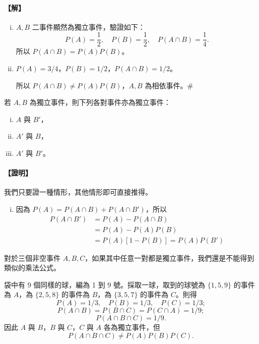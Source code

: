 \paragraph{【解】}
\begin{enumerate}[(i), leftmargin=2.5em, itemsep=0.3em]
  \item $A, B$ 二事件顯然為獨立事件，驗證如下：
  \[
  P(A) = \frac{1}{2}, \quad P(B) = \frac{1}{2}, \quad P(A \cap B) = \frac{1}{4}.
  \]
  所以 $P(A \cap B) = P(A)P(B)$。
  \item $P(A) = 3/4$，$P(B) = 1/2$，$P(A \cap B) = 1/2$。
  
  所以 $P(A \cap B) \neq P(A)P(B)$，$A, B$ 為相依事件。\hfill\#
\end{enumerate}

\medskip
\begin{theorem}\label{thm:b5s-4-7}
若 $A, B$ 為獨立事件，則下列各對事件亦為獨立事件：
\begin{enumerate}[(i), leftmargin=2.5em, itemsep=0.2em]
  \item $A$ 與 $B'$，
  \item $A'$ 與 $B$，
  \item $A'$ 與 $B'$。
\end{enumerate}
\end{theorem}
\paragraph{【證明】}
我們只要證一種情形，其他情形即可直接推得。
\begin{enumerate}[(i), leftmargin=2.5em, itemsep=0.3em]
  \item 因為 $P(A) = P(A \cap B) + P(A \cap B')$，所以
  \begin{align*}
  P(A \cap B') &= P(A) - P(A \cap B) \\
  &= P(A) - P(A)P(B) \\
  &= P(A)[1 - P(B)] = P(A)P(B') \tag*{\#}
  \end{align*}
\end{enumerate}

對於三個非空事件 $A, B, C$，如果其中任意一對都是獨立事件，我們還是不能得到類似的乘法公式。

\medskip
\begin{discussion}\label{disc:b5s-4-6}
袋中有 9 個同樣的球，編為 1 到 9 號。採取一球，取到的球號為 $\{1, 5, 9\}$ 的事件為 $A$，為 $\{2, 5, 8\}$ 的事件為 $B$，為 $\{3, 5, 7\}$ 的事件為 $C$。則得
\[
P(A) = 1/3, \quad P(B) = 1/3, \quad P(C) = 1/3;
\]
\[
P(A \cap B) = P(B \cap C) = P(C \cap A) = 1/9;
\]
\[
P(A \cap B \cap C) = 1/9.
\]
因此 $A$ 與 $B$，$B$ 與 $C$，$C$ 與 $A$ 各為獨立事件，但
\[
P(A \cap B \cap C) \neq P(A)P(B)P(C).
\]
\end{discussion}

